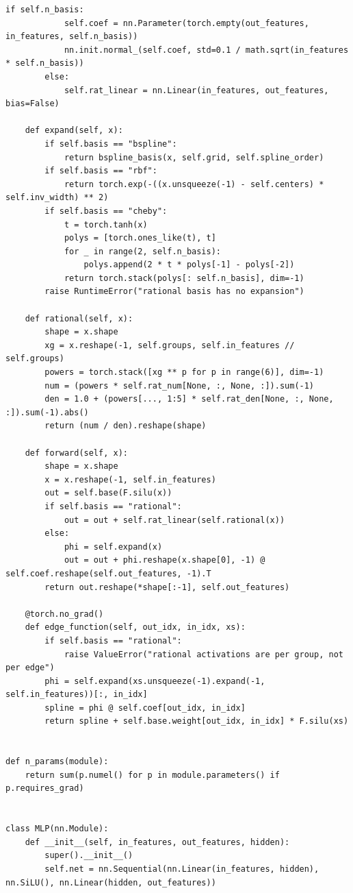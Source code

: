 \documentclass[12pt,a4paper]{report}
\begin{document}
\begin{lstlisting}[style=pythonstyle, caption={KAN layer, residual block and MLP control (\texttt{kanrec/kan.py}).}]
        if self.n_basis:
            self.coef = nn.Parameter(torch.empty(out_features, in_features, self.n_basis))
            nn.init.normal_(self.coef, std=0.1 / math.sqrt(in_features * self.n_basis))
        else:
            self.rat_linear = nn.Linear(in_features, out_features, bias=False)

    def expand(self, x):
        if self.basis == "bspline":
            return bspline_basis(x, self.grid, self.spline_order)
        if self.basis == "rbf":
            return torch.exp(-((x.unsqueeze(-1) - self.centers) * self.inv_width) ** 2)
        if self.basis == "cheby":
            t = torch.tanh(x)
            polys = [torch.ones_like(t), t]
            for _ in range(2, self.n_basis):
                polys.append(2 * t * polys[-1] - polys[-2])
            return torch.stack(polys[: self.n_basis], dim=-1)
        raise RuntimeError("rational basis has no expansion")

    def rational(self, x):
        shape = x.shape
        xg = x.reshape(-1, self.groups, self.in_features // self.groups)
        powers = torch.stack([xg ** p for p in range(6)], dim=-1)
        num = (powers * self.rat_num[None, :, None, :]).sum(-1)
        den = 1.0 + (powers[..., 1:5] * self.rat_den[None, :, None, :]).sum(-1).abs()
        return (num / den).reshape(shape)

    def forward(self, x):
        shape = x.shape
        x = x.reshape(-1, self.in_features)
        out = self.base(F.silu(x))
        if self.basis == "rational":
            out = out + self.rat_linear(self.rational(x))
        else:
            phi = self.expand(x)
            out = out + phi.reshape(x.shape[0], -1) @ self.coef.reshape(self.out_features, -1).T
        return out.reshape(*shape[:-1], self.out_features)

    @torch.no_grad()
    def edge_function(self, out_idx, in_idx, xs):
        if self.basis == "rational":
            raise ValueError("rational activations are per group, not per edge")
        phi = self.expand(xs.unsqueeze(-1).expand(-1, self.in_features))[:, in_idx]
        spline = phi @ self.coef[out_idx, in_idx]
        return spline + self.base.weight[out_idx, in_idx] * F.silu(xs)


def n_params(module):
    return sum(p.numel() for p in module.parameters() if p.requires_grad)


class MLP(nn.Module):
    def __init__(self, in_features, out_features, hidden):
        super().__init__()
        self.net = nn.Sequential(nn.Linear(in_features, hidden), nn.SiLU(), nn.Linear(hidden, out_features))


\end{lstlisting}
\end{document}
